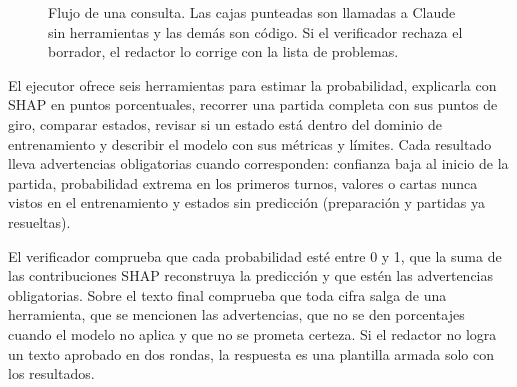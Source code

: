 \begin{figure}[!t]
\centering
{}
\caption{Flujo de una consulta. Las cajas punteadas son llamadas a Claude
sin herramientas y las demás son código. Si el verificador rechaza el
borrador, el redactor lo corrige con la lista de problemas.}
\label{fig:agente}
\end{figure}

El ejecutor ofrece seis herramientas para estimar la probabilidad, explicarla
con SHAP en puntos porcentuales, recorrer una partida completa con sus
puntos de giro, comparar estados, revisar si un estado está dentro del
dominio de entrenamiento y describir el modelo con sus métricas y límites.
Cada resultado lleva advertencias obligatorias cuando corresponden:
confianza baja al inicio de la partida, probabilidad extrema en los
primeros turnos, valores o cartas nunca vistos en el entrenamiento y
estados sin predicción (preparación y partidas ya resueltas).

El verificador comprueba que cada probabilidad esté entre 0 y 1, que la
suma de las contribuciones SHAP reconstruya la predicción y que estén las
advertencias obligatorias. Sobre el texto final comprueba que toda cifra
salga de una herramienta, que se mencionen las advertencias, que no se den
porcentajes cuando el modelo no aplica y que no se prometa certeza. Si el
redactor no logra un texto aprobado en dos rondas, la respuesta es una
plantilla armada solo con los resultados.

